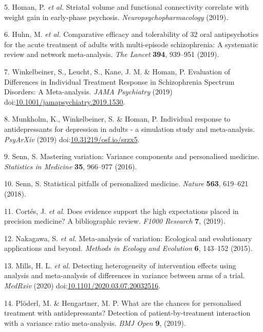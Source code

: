 \documentclass[9pt,english,,jou,floatsintext]{apa6}
\begin{document}
\hypertarget{ref-Homan2019k}{}
5. Homan, P. \emph{et al.} Striatal volume and functional connectivity
correlate with weight gain in early-phase psychosis.
\emph{Neuropsychopharmacology} (2019).

\hypertarget{ref-Huhn2019}{}
6. Huhn, M. \emph{et al.} Comparative efficacy and tolerability of 32
oral antipsychotics for the acute treatment of adults with multi-episode
schizophrenia: A systematic review and network meta-analysis. \emph{The
Lancet} \textbf{394}, 939--951 (2019).

\hypertarget{ref-Winkelbeiner2019}{}
7. Winkelbeiner, S., Leucht, S., Kane, J. M. \& Homan, P. Evaluation of
Differences in Individual Treatment Response in Schizophrenia Spectrum
Disorders: A Meta-analysis. \emph{JAMA Psychiatry} (2019)
doi:\href{https://doi.org/10.1001/jamapsychiatry.2019.1530}{10.1001/jamapsychiatry.2019.1530}.

\hypertarget{ref-Munkholm2019}{}
8. Munkholm, K., Winkelbeiner, S. \& Homan, P. Individual response to
antidepressants for depression in adults - a simulation study and
meta-analysis. \emph{PsyArXiv} (2019)
doi:\href{https://doi.org/10.31219/osf.io/srzx5}{10.31219/osf.io/srzx5}.

\hypertarget{ref-Senn2016}{}
9. Senn, S. Mastering variation: Variance components and personalised
medicine. \emph{Statistics in Medicine} \textbf{35}, 966--977 (2016).

\hypertarget{ref-Senn2018}{}
10. Senn, S. Statistical pitfalls of personalized medicine.
\emph{Nature} \textbf{563}, 619--621 (2018).

\hypertarget{ref-Cortes2019}{}
11. Cortés, J. \emph{et al.} Does evidence support the high expectations
placed in precision medicine? A bibliographic review. \emph{F1000
Research} \textbf{7}, (2019).

\hypertarget{ref-Nakagawa2015}{}
12. Nakagawa, S. \emph{et al.} Meta-analysis of variation: Ecological
and evolutionary applications and beyond. \emph{Methods in Ecology and
Evolution} \textbf{6}, 143--152 (2015).

\hypertarget{ref-Mills2020}{}
13. Mills, H. L. \emph{et al.} Detecting heterogeneity of intervention
effects using analysis and meta-analysis of differences in variance
between arms of a trial. \emph{MedRxiv} (2020)
doi:\href{https://doi.org/10.1101/2020.03.07.20032516}{10.1101/2020.03.07.20032516}.

\hypertarget{ref-Ploderl2019}{}
14. Plöderl, M. \& Hengartner, M. P. What are the chances for
personalised treatment with antidepressants? Detection of
patient-by-treatment interaction with a variance ratio meta-analysis.
\emph{BMJ Open} \textbf{9}, (2019).
\end{document}
